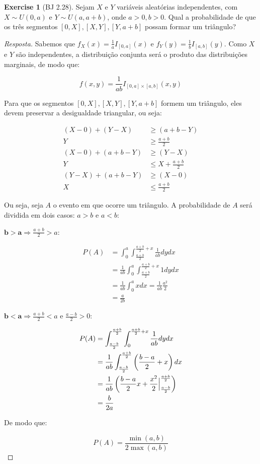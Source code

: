 \documentclass[
]{article}
\theoremstyle{definition}
\theoremstyle{definition}
\theoremstyle{definition}
\newtheorem{exercise}{Exercise}[section]
\theoremstyle{definition}
\theoremstyle{remark}
\begin{document}
\begin{exercise}[BJ 2.28]
Sejam \(X\) e \(Y\) variáveis aleatórias independentes, com \(X \sim U(0,a)\) e \(Y \sim U(a,a+b)\), onde \(a > 0, b > 0\). Qual a probabilidade de que os três segmentos \([0,X],[X,Y],[Y,a+b]\) possam formar um triângulo?
\end{exercise}

\begin{proof}[Resposta]
Sabemos que \(f_{X}(x) = \frac{1}{a}I_{[0,a]}(x)\) e \(f_{Y}(y) = \frac{1}{b}I_{[a,b]}(y)\). Como \(X\) e \(Y\) são independentes, a distribuição conjunta será o produto das distribuições marginais, de modo que:

\begin{equation*}
f(x,y) = \frac{1}{ab}I_{[0,a] \times [a,b]}(x,y)
\end{equation*}

Para que os segmentos \([0,X],[X,Y],[Y,a+b]\) formem um triângulo, eles devem preservar a desigualdade triangular, ou seja:

\begin{align*}
(X - 0)+(Y-X) &\ge (a+b-Y) \\
Y &\ge \frac{a+b}{2} \\
(X - 0)+(a+b-Y) &\ge (Y-X) \\
Y &\le X + \frac{a+b}{2} \\
(Y-X)+(a+b-Y) &\ge (X-0) \\
X &\le \frac{a+b}{2}
\end{align*}

Ou seja, seja \(A\) o evento em que ocorre um triângulo. A probabilidade de \(A\) será dividida em dois casos: \(a > b\) e \(a < b\):

\(\mathbf{b>a} \Rightarrow \frac{a+b}{2} > a\):

\begin{align*}
P(A) &= \int_{0}^{a}\int_{\frac{a+b}{2}}^{\frac{a+b}{2} + x}\frac{1}{ab}dydx \\
&= \frac{1}{ab}\int_{0}^{a}\int_{\frac{a+b}{2}}^{\frac{a+b}{2} + x}1dydx \\
&= \frac{1}{ab}\int_{0}^{a}xdx = \frac{1}{ab}\frac{a^{2}}{2} \\
&= \frac{a}{2b}
\end{align*}

\(\mathbf{b<a} \Rightarrow \frac{a+b}{2} < a\) e \(\frac{a-b}{2} > 0\):

\begin{align*}
P(A) &= \int_{\frac{a-b}{2}}^{\frac{a+b}{2}}\int_{0}^{\frac{a+b}{2} + x}\frac{1}{ab}dydx \\
&= \frac{1}{ab}\int_{\frac{a-b}{2}}^{\frac{a+b}{2}}\left(\frac{b-a}{2} + x\right)dx \\
&= \frac{1}{ab}\left(\frac{b-a}{2}x + \frac{x^{2}}{2}\Big{|}_{\frac{a-b}{2}}^{\frac{a+b}{2}}\right) \\
&= \frac{b}{2a}
\end{align*}

De modo que:

\begin{equation*}
P(A) = \frac{\min(a,b)}{2\max(a,b)}
\end{equation*}
\end{proof}
\end{document}
